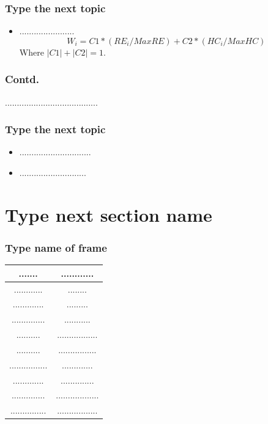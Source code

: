 \documentclass[]{beamer}
\begin{document}
\begin{frame}
\frametitle{Type the next topic}
\begin{itemize}
\item<1-> .......................
\begin{equation}
W_{i} = C1 * (RE_{i} /MaxRE) + C2 * (HC_{i} /MaxHC)
\end{equation}  
Where $|C1|+|C2|=1 .$


\end{itemize}
\end{frame}

\begin{frame}
\frametitle{Contd.}
.......................................
\end{frame}


\begin{frame}
\frametitle{Type the next topic}
\begin{itemize}
\item .............................. 
\item ............................
\end{itemize}
\end{frame}
 



\section{Type next section name}
\begin{frame}
\frametitle{Type name of frame}
\begin{tabular}{|c|c|}
\hline
....... & ............\\
\hline
............ & ........\\
\hline
............. & .........\\
\hline
.............. & ...........\\
\hline
.......... & .................\\
\hline
.......... & ................\\
\hline
................ & .............\\
\hline
............. & ..............\\
\hline
.............. & ..................\\
\hline
............... & .................\\
\hline
\end{tabular}
\end{frame}
\end{document}
